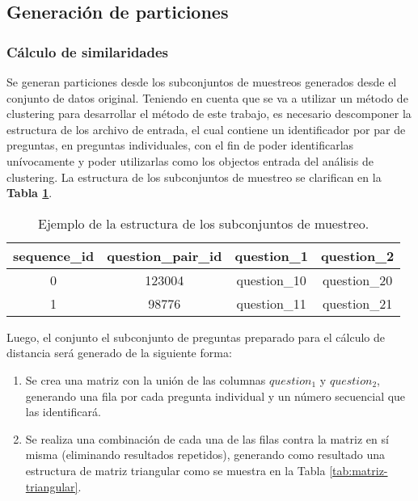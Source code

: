\subsection{Generación de particiones}
\subsubsection{Cálculo de similaridades}
Se generan particiones desde los subconjuntos de muestreos generados desde el conjunto de datos original. Teniendo en cuenta que se va a utilizar un método de clustering para desarrollar el método de este trabajo, es necesario descomponer la estructura de los archivo de entrada, el cual contiene un identificador por par de preguntas, en preguntas individuales, con el fin de poder identificarlas unívocamente y poder utilizarlas como los objectos entrada del análisis de clustering. La estructura de los subconjuntos de muestreo se clarifican en la \textbf{Tabla \ref{tab:archivo-entrada}}.

\begin{table}[]
	\centering
	\begin{tabular}{|c|c|c|c|}
		\hline
		\textbf{sequence\_id} & \textbf{question\_pair\_id} & \textbf{question\_1} & \textbf{question\_2} \\ \hline
		0                     & 123004                      & question\_10         & question\_20         \\ \hline
		1                     & 98776                       & question\_11         & question\_21         \\ \hline
	\end{tabular}
	\caption{Ejemplo de la estructura de los subconjuntos de muestreo.}
	\label{tab:archivo-entrada}
\end{table}

Luego, el conjunto el subconjunto de preguntas preparado para el cálculo de distancia será generado de la siguiente forma:
\begin{enumerate}
	\item Se crea una matriz con la unión de las columnas \(question_1\) y \(question_2\), generando una fila por cada pregunta individual y un número secuencial que las identificará.
	\item Se realiza una combinación de cada una de las filas contra la matriz en sí misma (eliminando resultados repetidos), generando como resultado una estructura de matriz triangular como se muestra en la Tabla \ref{tab:matriz-triangular}.
\end{enumerate}

